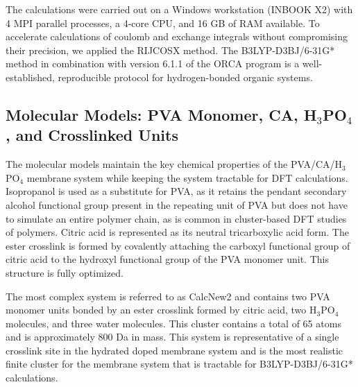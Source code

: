 \documentclass[12pt,a4paper]{report}
\begin{document}
The calculations were carried out on a Windows workstation (INBOOK X2) with 4 MPI parallel processes, a 4-core CPU, and 16 GB of RAM available. To accelerate calculations of coulomb and exchange integrals without compromising their precision, we applied the RIJCOSX method.\cite{80} The B3LYP-D3BJ/6-31G* method in combination with version 6.1.1 of the ORCA program is a well-established, reproducible protocol for hydrogen-bonded organic systems.

\subsection{Molecular Models: PVA Monomer, CA, H\(_3\)PO\(_4\), and Crosslinked Units}
The molecular models maintain the key chemical properties of the PVA/CA/H\(_3\)PO\(_4\) membrane system while keeping the system tractable for DFT calculations. Isopropanol is used as a substitute for PVA, as it retains the pendant secondary alcohol functional group present in the repeating unit of PVA but does not have to simulate an entire polymer chain, as is common in cluster-based DFT studies of polymers.\cite{18,19} Citric acid is represented as its neutral tricarboxylic acid form. The ester crosslink is formed by covalently attaching the carboxyl functional group of citric acid to the hydroxyl functional group of the PVA monomer unit. This structure is fully optimized.

The most complex system is referred to as CalcNew2 and contains two PVA monomer units bonded by an ester crosslink formed by citric acid, two H\(_3\)PO\(_4\) molecules, and three water molecules. This cluster contains a total of 65 atoms and is approximately 800 Da in mass. This system is representative of a single crosslink site in the hydrated doped membrane system and is the most realistic finite cluster for the membrane system that is tractable for B3LYP-D3BJ/6-31G* calculations.
\end{document}
